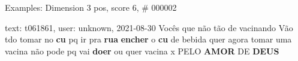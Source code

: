 \begin{frame}{Examples: Dimension 3 pos, score 6, \# 000002}
\footnotesize
\begin{exampleblock}{text: t061861, user: unknown, 2021-08-30}
Vocês que não tão de vacinando Vão tdo tomar no \textbf{cu} pq ir pra 
\textbf{rua} \textbf{encher} o \textbf{cu} de bebida quer agora tomar uma 
vacina não pode pq vai \textbf{doer} ou quer vacina x PELO \textbf{AMOR} DE 
\textbf{DEUS} 
\end{exampleblock}
\end{frame}
